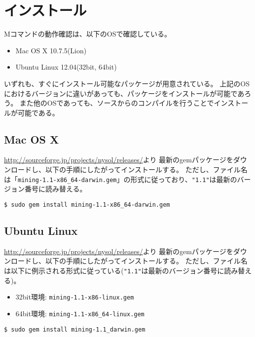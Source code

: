 %

\section{インストール\label{sect:install}}
Mコマンドの動作確認は、以下のOSで確認している。
\begin{itemize}
\item Mac OS X 10.7.5(Lion)
\item Ubuntu Linux 12.04(32bit, 64bit)
\end{itemize}

いずれも、すぐにインストール可能なパッケージが用意されている。
上記のOSにおけるバージョンに違いがあっても、パッケージをインストールが可能であろう。
また他のOSであっても、ソースからのコンパイルを行うことでインストールが可能である。

\subsection{Mac OS X\label{sect:install_osx}}
\href{http://sourceforge.jp/projects/nysol/releases/}{http://sourceforge.jp/projects/nysol/releases/}より
最新のgemパッケージをダウンロードし、以下の手順にしたがってインストールする。
ただし、ファイル名は「\verb|mining-1.1-x86_64-darwin.gem|」の形式に従っており、\verb|"1.1"|は最新のバージョン番号に読み替える。

\begin{Verbatim}[baselinestretch=0.7,frame=single]
$ sudo gem install mining-1.1-x86_64-darwin.gem
\end{Verbatim}

\subsection{Ubuntu Linux\label{sect:install_ubuntu}}
\href{http://sourceforge.jp/projects/nysol/releases/}{http://sourceforge.jp/projects/nysol/releases/}より
最新のgemパッケージをダウンロードし、以下の手順にしたがってインストールする。
ただし、ファイル名は以下に例示される形式に従っている(\verb|"1.1"|は最新のバージョン番号に読み替える)。
\begin{itemize}
\item 32bit環境: \verb|mining-1.1-x86-linux.gem|
\item 64bit環境: \verb|mining-1.1-x86_64-linux.gem|
\end{itemize}

\begin{Verbatim}[baselinestretch=0.7,frame=single]
$ sudo gem install mining-1.1_darwin.gem
\end{Verbatim}

